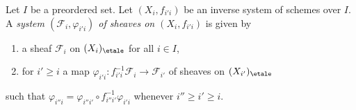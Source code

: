 \begin{definition}
\label{definition-inverse-system-sheaves}
Let $I$ be a preordered set. Let $(X_i, f_{i'i})$ be an inverse
system of schemes over $I$.
A {\it system $(\mathcal{F}_i, \varphi_{i'i})$ of sheaves
on $(X_i, f_{i'i})$} is given by
\begin{enumerate}
\item a sheaf $\mathcal{F}_i$ on $(X_i)_\etale$ for all $i \in I$,
\item for $i' \geq i$ a map
$\varphi_{i'i} : f_{i'i}^{-1}\mathcal{F}_i \to \mathcal{F}_{i'}$
of sheaves on $(X_{i'})_\etale$
\end{enumerate}
such that $\varphi_{i''i} = \varphi_{i''i'} \circ f_{i'' i'}^{-1}\varphi_{i'i}$
whenever $i'' \geq i' \geq i$.
\end{definition}